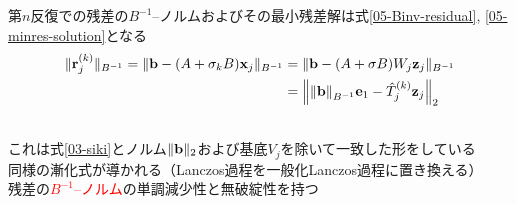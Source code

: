 

第$n$反復での残差の$B^{-1}$--ノルムおよびその最小残差解は式\eqref{05-Binv-residual}, \eqref{05-minres-solution}となる
\begin{align}
	\|\vb{r}_{j}^{(k)}\|_{B^{-1}} = \|\vb{b} - (A + \sigma_{k}B)\vb{x}_{j}\|_{B^{-1}}
		&= \|\vb{b} - (A + \sigma B)W_{j}\vb{z}_{j} \|_{B^{-1}} \notag \\
		&= \left\| \norm{\vb{b}}_{B^{-1}}\vb{e}_1 - \hat{T}_{j}^{(k)} \vb{z}_{j} \right\|_2
		\label{05-Binv-residual}\\
	&\hspace*{-17.5cm}\Rightarrow \ \vb{x}_{n}^{(k)} = \|\vb{b}\|_{B^{-1}} W_{j} R_{j}^{-1} Q_{j}^{\htop} \vb{e}_1
	\label{05-minres-solution}
\end{align}
これは式\eqref{03-siki}とノルム$\|\vb{b}\|_2$および基底$V_{j}$を除いて一致した形をしている\\
\myitem 同様の漸化式が導かれる（Lanczos過程を一般化Lanczos過程に置き換える）\\
\myitem 残差の\textcolor{red}{$B^{-1}$--ノルム}の単調減少性と無破綻性を持つ